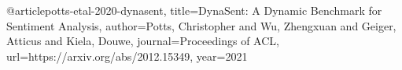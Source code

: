 @article{potts-etal-2020-dynasent,
    title={{DynaSent}: A Dynamic Benchmark for Sentiment Analysis},
    author={Potts, Christopher and Wu, Zhengxuan and Geiger, Atticus and Kiela, Douwe},
    journal={Proceedings of ACL},
    url={https://arxiv.org/abs/2012.15349},
    year={2021}}
